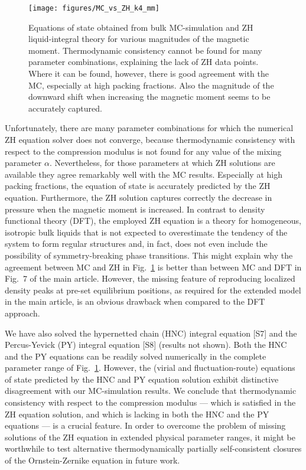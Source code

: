 \documentclass[aps,pre,twocolumn,superscriptaddress,nofootinbib]{revtex4}
\begin{document}
%
\begin{figure}
	\texttt{[image: figures/MC\_vs\_ZH\_k4\_mm]}
	\caption{Equations of state obtained from bulk MC-simulation and ZH liquid-integral theory for various magnitudes of the magnetic moment. Thermodynamic consistency cannot be found for many parameter combinations, explaining the lack of ZH data points. Where it can be found, however, there is good agreement with the MC, especially at high packing fractions. Also the magnitude of the downward shift when increasing the magnetic moment seems to be accurately captured.}
	\label{Fig.MC_vs_ZH_k4_mm}
\end{figure}
% 
Unfortunately, there are many parameter combinations for which the numerical ZH equation solver does not converge, because thermodynamic consistency with respect to the compression modulus is not found for any value of the mixing parameter $\alpha$. 
Nevertheless, for those parameters at which ZH solutions are available they agree remarkably well with the MC results. 
Especially at high packing fractions, the equation of state is accurately predicted by the ZH equation. 
Furthermore, the ZH solution captures correctly the decrease in pressure when the magnetic moment is increased. 
In contrast to density functional theory (DFT), the employed ZH equation is a theory for homogeneous, isotropic bulk liquids that is not expected to overestimate the tendency of the system to form regular structures and, in fact, does not even include the possibility of symmetry-breaking phase transitions. 
This might explain why the agreement between MC and ZH in Fig.~\ref{Fig.MC_vs_ZH_k4_mm} is better than between MC and DFT in Fig.~7 of the main article. %
However, the missing feature of reproducing localized density peaks at pre-set equilibrium positions, as required for the extended model in the main article, is an obvious drawback when compared to the DFT approach.

We have also solved the hypernetted chain (HNC) integral equation [S7] and the Percus-Yevick (PY) integral equation [S8] (results not shown). 
Both the HNC and the PY equations can be readily solved numerically in the complete parameter range of Fig.~\ref{Fig.MC_vs_ZH_k4_mm}. 
However, the (virial and fluctuation-route) equations of state predicted by the HNC and PY equation solution exhibit distinctive disagreement with our MC-simulation results. 
We conclude that thermodynamic consistency with respect to the compression modulus --- which is satisfied in the ZH equation solution, and which is lacking in both the HNC and the PY equations --- is a crucial feature.
In order to overcome the problem of missing solutions of the ZH equation in extended physical parameter ranges, it might be worthwhile to test alternative thermodynamically partially self-consistent closures of the Ornstein-Zernike equation in future work.
\end{document}
